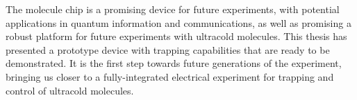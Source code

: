 The molecule chip is a promising device for future experiments, with potential
applications in quantum information and communications, as well as promising a
robust platform for future experiments with ultracold molecules. This thesis
has presented a prototype device with trapping capabilities that are ready to
be demonstrated. It is the first step towards future generations of the
experiment, bringing us closer to a fully-integrated electrical experiment for
trapping and control of ultracold molecules.
